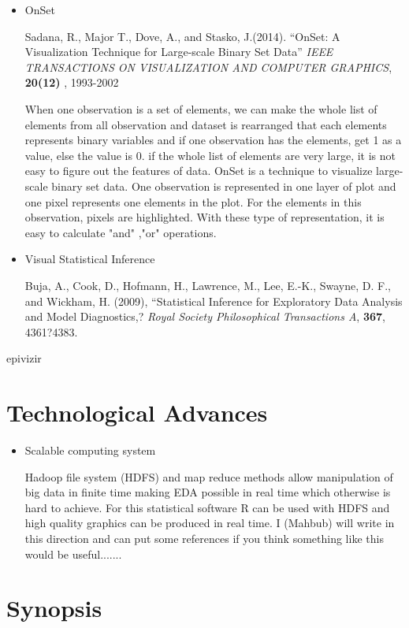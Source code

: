 \documentclass{article}
\begin{document}
\begin{itemize}
\item OnSet

Sadana, R., Major T., Dove, A., and Stasko, J.(2014).
``OnSet: A Visualization Technique for Large-scale Binary Set Data''
{\em IEEE TRANSACTIONS ON VISUALIZATION AND COMPUTER GRAPHICS}, {\bf 20(12)} , 1993-2002


When one observation is a set of elements, we can make the whole list of elements from all observation and dataset is rearranged that each elements represents binary variables and if one observation has the elements, get 1 as a value, else the value is 0. if the whole list of elements are very large, it is not easy to figure out the features of data.
OnSet\citep{sadana2014onset} is a technique to visualize large-scale binary set data. One observation is represented in one layer of plot and one pixel represents one elements in the plot. For the elements in this observation, pixels are highlighted. With these type of representation, it is easy to calculate "and" ,"or" operations.

\item Visual Statistical Inference

Buja, A., Cook, D., Hofmann, H., Lawrence, M., Lee, E.-K., Swayne, D. F., and Wickham, H. (2009), ``Statistical Inference for Exploratory Data Analysis and Model Diagnostics,? {\em Royal Society Philosophical Transactions A}, {\bf 367}, 4361?4383.


\end{itemize}

epivizir

\section{Technological Advances}

\begin{itemize}
	\item{Scalable computing system}
	
	Hadoop file system (HDFS) and map reduce methods allow manipulation of big data in finite time making EDA possible in real time which otherwise is hard to achieve. For this statistical software R can be used with HDFS and high quality graphics can be produced in real time. I (Mahbub) will write in this direction and can put some references if you think something like this would be useful.......
	
\end{itemize}

\section{Synopsis}
\end{document}
